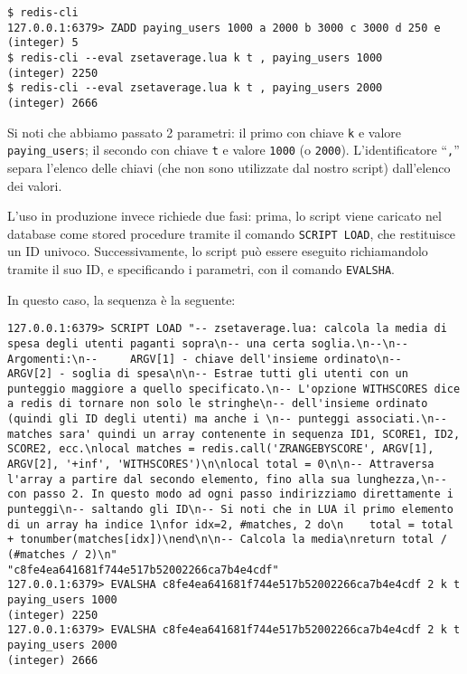 \medskip
\begin{lstlisting}
$ redis-cli
127.0.0.1:6379> ZADD paying_users 1000 a 2000 b 3000 c 3000 d 250 e
(integer) 5
$ redis-cli --eval zsetaverage.lua k t , paying_users 1000
(integer) 2250
$ redis-cli --eval zsetaverage.lua k t , paying_users 2000
(integer) 2666
\end{lstlisting}

Si noti che abbiamo passato 2 parametri: il primo con chiave \verb|k| e valore \verb|paying_users|;
il secondo con chiave \verb|t| e valore \verb|1000| (o \verb|2000|). L'identificatore ``\verb|,|''
separa l'elenco delle chiavi (che non sono utilizzate dal nostro script) dall'elenco dei valori.

L'uso in produzione invece richiede due fasi: prima, lo script viene caricato nel database
come stored procedure tramite il comando \verb|SCRIPT LOAD|, che restituisce un ID univoco. 
Successivamente, lo script può essere eseguito richiamandolo tramite il suo ID, e specificando 
i parametri, con il comando \verb|EVALSHA|.

In questo caso, la sequenza è la seguente:

\medskip
\begin{lstlisting}
127.0.0.1:6379> SCRIPT LOAD "-- zsetaverage.lua: calcola la media di spesa degli utenti paganti sopra\n-- una certa soglia.\n--\n-- Argomenti:\n--     ARGV[1] - chiave dell'insieme ordinato\n--     ARGV[2] - soglia di spesa\n\n-- Estrae tutti gli utenti con un punteggio maggiore a quello specificato.\n-- L'opzione WITHSCORES dice a redis di tornare non solo le stringhe\n-- dell'insieme ordinato (quindi gli ID degli utenti) ma anche i \n-- punteggi associati.\n-- matches sara' quindi un array contenente in sequenza ID1, SCORE1, ID2, SCORE2, ecc.\nlocal matches = redis.call('ZRANGEBYSCORE', ARGV[1], ARGV[2], '+inf', 'WITHSCORES')\n\nlocal total = 0\n\n-- Attraversa l'array a partire dal secondo elemento, fino alla sua lunghezza,\n-- con passo 2. In questo modo ad ogni passo indirizziamo direttamente i punteggi\n-- saltando gli ID\n-- Si noti che in LUA il primo elemento di un array ha indice 1\nfor idx=2, #matches, 2 do\n    total = total + tonumber(matches[idx])\nend\n\n-- Calcola la media\nreturn total / (#matches / 2)\n"
"c8fe4ea641681f744e517b52002266ca7b4e4cdf"
127.0.0.1:6379> EVALSHA c8fe4ea641681f744e517b52002266ca7b4e4cdf 2 k t paying_users 1000
(integer) 2250
127.0.0.1:6379> EVALSHA c8fe4ea641681f744e517b52002266ca7b4e4cdf 2 k t paying_users 2000
(integer) 2666
\end{lstlisting}


